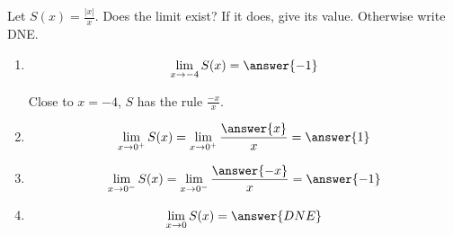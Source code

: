 \documentclass{ximera}
\author{Steven Gubkin/Nela Lakos}
\begin{document}
\begin{exercise}

Let $S(x) = \frac{|x|}{x}$.  Does the limit exist?  If it
does, give its value.  Otherwise write DNE.
\begin{enumerate}
\item 
\begin{prompt}
\[
\lim_{x \to -4} S(x) = \answer{-1}
\] 
\end{prompt}
\begin{hint}
  Close to $x=-4$, $S$ has the rule $\frac{-x}{x}$.
\end{hint}
\item
\[
\lim_{x \to 0^{+}} S(x) =\lim_{x \to 0^{+}} \frac{\answer{x}}{x} = \answer{1}
\] 
\item 
\[
\lim_{x \to 0^{-}} S(x) =\lim_{x \to 0^{-}} \frac{\answer{-x}}{x} = \answer{-1}
\] 
\item
\[
\lim_{x \to 0} S(x) = \answer{DNE}
\] 
\end{enumerate}
\end{exercise}
\end{document}
